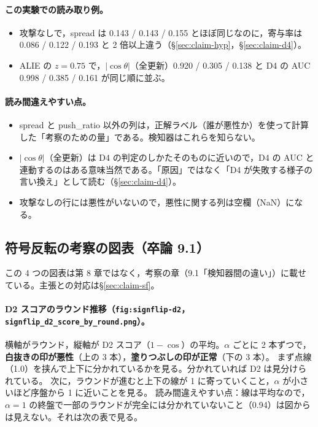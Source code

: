 \documentclass[a4j, dvipdfmx]{jsarticle}  %
\begin{document}
\paragraph{この実験での読み取り例。}
\begin{itemize}
  \item 攻撃なしで，spread は 0.143 / 0.143 / 0.155 とほぼ同じなのに，寄与率は 0.086 / 0.122 / 0.193 と 2 倍以上違う（\S\ref{sec:claim-hyp}，\S\ref{sec:claim-d4}）。
  \item ALIE の $z = 0.75$ で，$|\cos\theta|$（全更新）0.920 / 0.305 / 0.138 と D4 の AUC 0.998 / 0.385 / 0.161 が同じ順に並ぶ。
\end{itemize}

\paragraph{読み間違えやすい点。}
\begin{itemize}
  \item spread と push\_ratio 以外の列は，正解ラベル（誰が悪性か）を使って計算した「考察のための量」である。検知器はこれらを知らない。
  \item $|\cos\theta|$（全更新）は D4 の判定のしかたそのものに近いので，D4 の AUC と連動するのはある意味当然である。「原因」ではなく「D4 が失敗する様子の言い換え」として読む（\S\ref{sec:claim-d4}）。
  \item 攻撃なしの行には悪性がいないので，悪性に関する列は空欄（NaN）になる。
\end{itemize}

\subsection{符号反転の考察の図表（卒論 9.1）}
\label{sec:read-signflip}

この 4 つの図表は第 8 章ではなく，考察の章（9.1「検知器間の違い」）に載せている。主張との対応は\S\ref{sec:claim-sf}。

\paragraph{D2 スコアのラウンド推移（\texttt{fig:signflip-d2}，\texttt{signflip\_d2\_score\_by\_round.png}）。}
横軸がラウンド，縦軸が D2 スコア（$1 - \cos$）の平均。$\alpha$ ごとに 2 本ずつで，\textbf{白抜きの印が悪性}（上の 3 本），\textbf{塗りつぶしの印が正常}（下の 3 本）。
まず点線（1.0）を挟んで上下に分かれているかを見る。分かれていれば D2 は見分けられている。
次に，ラウンドが進むと上下の線が 1 に寄っていくこと，$\alpha$ が小さいほど序盤から 1 に近いことを見る。
読み間違えやすい点：線は平均なので，$\alpha = 1$ の終盤で一部のラウンドが完全には分かれていないこと（0.94）は図からは見えない。それは次の表で見る。
\end{document}
